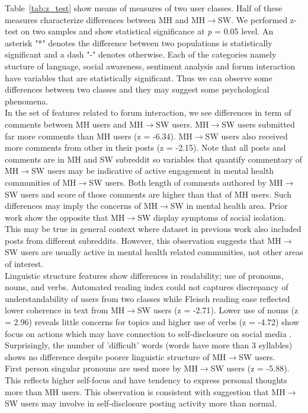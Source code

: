 Table~\ref{tab:z_test} show means of measures of two user classes. Half of these measures characterize differences between MH and MH$\rightarrow$SW. We performed z-test on two samples and show statistical significance at \textit{p} = 0.05 level. An asterisk "*" denotes the difference between two populations is statistically significant and a dash "-" denotes otherwise. Each of the categories namely stucture of language, social awareness, sentiment analysis and forum interaction have variables that are statistically significant. Thus we can observe some differences between two classes and they may suggest some psychological phenomena.\\
In the set of features related to forum interaction, we see differences in term of comments between MH users and MH$\rightarrow$SW users. MH$\rightarrow$SW users submitted far more comments than MH users (z = -6.34). MH$\rightarrow$SW users also received more comments from other in their posts (z = -2.15). Note that all posts and comments are in MH and SW subreddit so variables that quantify commentary of  MH$\rightarrow$SW users may be indicative of active engagement in mental health communities of  MH$\rightarrow$SW users. Both length of comments authored by MH$\rightarrow$SW users and score of those comments are higher than that of MH users. Such differences may imply the concerns of MH$\rightarrow$SW in mental health area. Prior work \cite{DeChoudhury2016} show the opposite that MH$\rightarrow$SW display symptoms of social isolation. This may be true in general context where dataset in previous work also included posts from different subreddits. However, this observation suggests that MH$\rightarrow$SW users are usually active in mental health related communities, not other areas of interest.\\
Linguistic structure features show differences in readability; use of pronouns, nouns, and verbs. Automated reading index could not captures discrepancy of understandability of users from two classes while Fleisch reading ease reflected lower coherence in text from MH$\rightarrow$SW users (z = -2.71). Lower use of nouns (z = 2.96) reveals little concerns for topics \cite{Coppersmith2014}and higher use of verbs (z = -4.72) show focus on actions which may have connection to self-disclosure on social media \cite{Houghton2012}. Surprisingly, the number of 'difficult' words (words have more than 3 syllables) shows no difference despite poorer linguistic structure of MH$\rightarrow$SW users.\\
First person singular pronouns are used more by MH$\rightarrow$SW users (z = -5.88). This reflects higher self-focus and have tendency to express personal thoughts more than MH users. This observation is consistent with suggestion that MH$\rightarrow$SW users may involve in self-disclosure posting activity more than normal.\\
